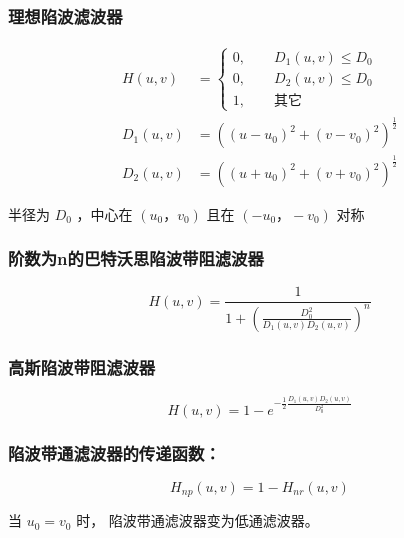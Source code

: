 \documentclass{beamer}
\begin{document}
\begin{frame}
\frametitle{理想陷波滤波器}
\label{sec-8-11}


\begin{align*}
H(u,v) &= \begin{cases}
0,\qquad D_1(u,v)\leq D_0  \\
0, \qquad D_2(u,v)\leq D_0 \\
1, \qquad \text{其它}
\end{cases}\\
D_1(u,v) &=\left((u-u_0)^2+(v-v_0)^2\right)^{\frac{1}{2}}\\
D_2(u,v) &=\left((u+u_0)^2+(v+v_0)^2\right)^{\frac{1}{2}}
\end{align*}

半径为 $D_0$ ，中心在 $(u_0，v_0)$ 且在 $(-u_0，-v_0)$ 对称
\end{frame}
\begin{frame}
\frametitle{阶数为n的巴特沃思陷波带阻滤波器}
\label{sec-8-12}

\[
H(u,v)=\frac{1}{1+\left(\frac{D_0^2}{D_1(u,v)D_2(u,v)}\right)^n}
\]
\end{frame}
\begin{frame}
\frametitle{高斯陷波带阻滤波器}
\label{sec-8-13}

\[
H(u,v)=1-e^{-\frac{1}{2}\frac{D_1(u,v)D_2(u,v)}{D_0^2}}
\]
\end{frame}
\begin{frame}
\frametitle{陷波带通滤波器的传递函数：}
\label{sec-8-14}

\[ 
H_{np}(u,v)=1-H_{nr}(u,v)
\]


当 $u_0=v_0$ 时， 陷波带通滤波器变为低通滤波器。
\end{frame}
\end{document}

